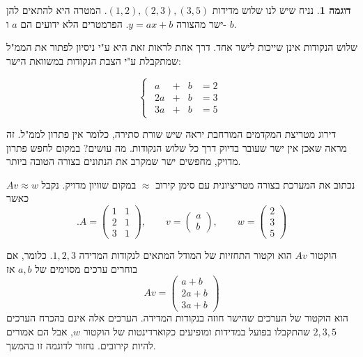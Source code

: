 \documentclass[12pt]{report}
\theoremstyle{plain}
\theoremstyle{definition}
\newtheorem{example}{דוגמה}[chapter]
\newcommand{\0}{\mathbf{0}}
\begin{document}
\begin{example}\label{ex:least-squares}
נניח שיש לנו שלוש מדידות
$(1,2),(2,3),(3,5)$.
המטרה היא להתאים להן ישר מהצורה
$y=ax+b$.
הפרמטרים הלא ידועים הם
$a$
ו-
$b$.

שלוש הנקודות אינן שייכות לישר אחד. דרך אחת לראות זאת היא ע"י ניסיון לפתור את הממ"ל שמתקבלת ע"י הצבת הנקודות במשוואת הישר:

$$
\begin{cases}
\begin{alignedat}{3}
 a &{}+{}& b &= 2\\
2a &{}+{}& b &= 3\\
3a &{}+{}& b &= 5
\end{alignedat}
\end{cases}
$$

דירוג מטריצת המקדמים המורחבת יראה שיש שורת סתירה, כלומר אין פתרון לממ"ל. זה מראה שאכן אין ישר שעובר בדיוק דרך כל שלוש הנקודות. מה עושים? במקום לחפש פתרון מדויק, מחפשים ישר שמקרב את הנתונים בצורה הטובה ביותר.

נכתוב את המערכת בצורה מטריציונית עם סימן קירוב
$\approx$
במקום שוויון מדויק. נקבל
$Av\approx w$
כאשר
$$
.A=
\begin{pmatrix}
1 & 1\\
2 & 1\\
3 & 1
\end{pmatrix},
\qquad
v=
\begin{pmatrix}
a\\
b
\end{pmatrix},
\qquad
w=
\begin{pmatrix}
2\\
3\\
5
\end{pmatrix}
$$

הוקטור
$Av$
הוא וקטור התחזיות של המודל המתאים לנקודות המדידה 
$1,2,3$.
כלומר, אם בוחרים ערכים מסוימים של
$a,b$
אז
$$
Av=
\begin{pmatrix}
a+b\\
2a+b\\
3a+b
\end{pmatrix}
$$
הוא הוקטור של הערכים שהישר חוזה בנקודות המדידה.
הערכים אלה אינם בהכרח הערכים 
$2,3,5$
שהתקבלו בפועל במדידות ומופיעים כקוארדינטות של הוקטור
$w$,
אבל הם אמורים להיות קירובים. נחזור לדוגמה זו בהמשך.

\end{example}
\end{document}
